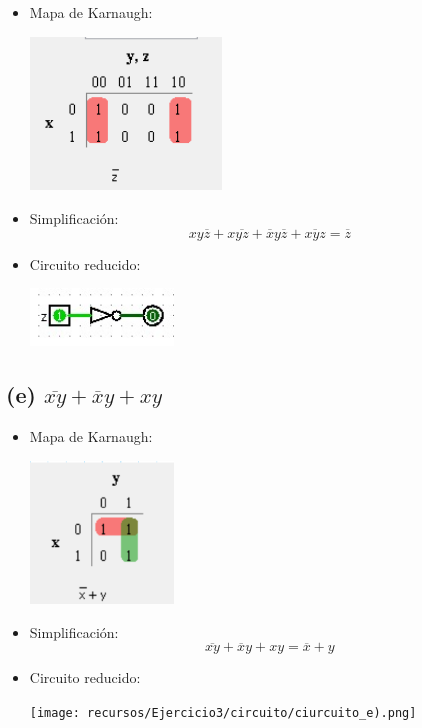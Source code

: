 \begin{itemize}
    \item Mapa de Karnaugh:
\begin{center}
    \includegraphics[width=0.4\textwidth]{recursos/Ejercicio3/mapas/mapa_d).png}
\end{center}

    \item Simplificación: \[ xy\overline{z} + x\overline{yz} + \overline{x}y\overline{z} + \overline{xyz} = \overline{z} \]

    \item Circuito reducido:
\begin{center}
    \includegraphics[width=0.3\textwidth]{recursos/Ejercicio3/circuito/circuito_d).png}
\end{center}
\end{itemize}

\subsection*{(e) $\overline{xy} + \overline{x}y + xy$}

\begin{itemize}
    \item Mapa de Karnaugh:
\begin{center}
    \includegraphics[width=0.3\textwidth]{recursos/Ejercicio3/mapas/mapa_e).png}
\end{center}

    \item Simplificación: \[ \overline{xy} + \overline{x}y + xy = \overline{x} + y \]

    \item Circuito reducido:
\begin{center}
    \texttt{[image: recursos/Ejercicio3/circuito/ciurcuito\_e).png]}
\end{center}
\end{itemize}

